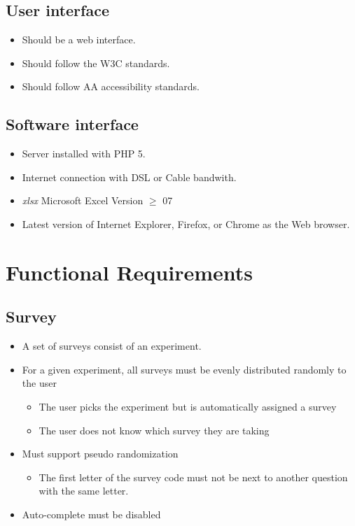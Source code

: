 \documentclass[a4paper,12pt,oneside]{report}
\begin{document}
\subsection{User interface}
\begin{itemize}
	\item Should be a web interface.
	\item Should follow the W3C standards.
	\item Should follow AA accessibility standards.
\end{itemize}
\subsection{Software interface}
\begin{itemize}
	\item Server installed with PHP 5.
	\item Internet connection with DSL or Cable bandwith.
	\item {\it xlsx} Microsoft Excel Version $\geq$ 07
	\item Latest version of Internet Explorer, Firefox, or Chrome as the Web browser.
\end{itemize}

\section{Functional Requirements}

\subsection {Survey}
\begin{itemize}
	\item A set of surveys consist of an experiment.
	\item For a given experiment, all surveys must be evenly distributed randomly to the user
       	\begin{itemize}   
		\item The user picks the experiment but is automatically assigned a survey
               	\item The user does not know which survey they are taking
	\end{itemize}
        \item Must support pseudo randomization
	\begin{itemize}
                \item The first letter of the survey code must not be next to another question with the same letter.
	\end{itemize}
       	\item Auto-complete must be disabled
\end{itemize}
\end{document}
